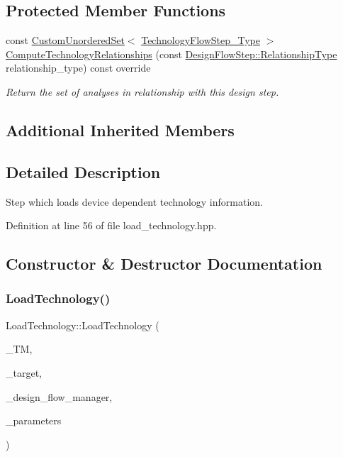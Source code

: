 \subsection*{Protected Member Functions}
\begin{DoxyCompactItemize}
\item 
const \hyperlink{classCustomUnorderedSet}{Custom\+Unordered\+Set}$<$ \hyperlink{technology__flow__step_8hpp_a65208cfec963a7d7def292f9db428292}{Technology\+Flow\+Step\+\_\+\+Type} $>$ \hyperlink{classLoadTechnology_a2e08243cc28d6a0a11e258f84c1ec0fa}{Compute\+Technology\+Relationships} (const \hyperlink{classDesignFlowStep_a723a3baf19ff2ceb77bc13e099d0b1b7}{Design\+Flow\+Step\+::\+Relationship\+Type} relationship\+\_\+type) const override
\begin{DoxyCompactList}\small\item\em Return the set of analyses in relationship with this design step. \end{DoxyCompactList}\end{DoxyCompactItemize}
\subsection*{Additional Inherited Members}


\subsection{Detailed Description}
Step which loads device dependent technology information. 

Definition at line 56 of file load\+\_\+technology.\+hpp.



\subsection{Constructor \& Destructor Documentation}
\mbox{\label{classLoadTechnology_ab08684eff1b058d69b11e84ee37c89b5}} 
\subsubsection{\texorpdfstring{Load\+Technology()}{LoadTechnology()}}
{\footnotesize\ttfamily Load\+Technology\+::\+Load\+Technology (\begin{DoxyParamCaption}\item[{const \hyperlink{technology__manager_8hpp_a4b9ecd440c804109c962654f9227244e}{technology\+\_\+manager\+Ref}}]{\+\_\+\+TM,  }\item[{const \hyperlink{target__device_8hpp_acedb2b7a617e27e6354a8049fee44eda}{target\+\_\+device\+Ref}}]{\+\_\+target,  }\item[{const Design\+Flow\+Manager\+Const\+Ref}]{\+\_\+design\+\_\+flow\+\_\+manager,  }\item[{const \hyperlink{Parameter_8hpp_a37841774a6fcb479b597fdf8955eb4ea}{Parameter\+Const\+Ref}}]{\+\_\+parameters }\end{DoxyParamCaption})}



